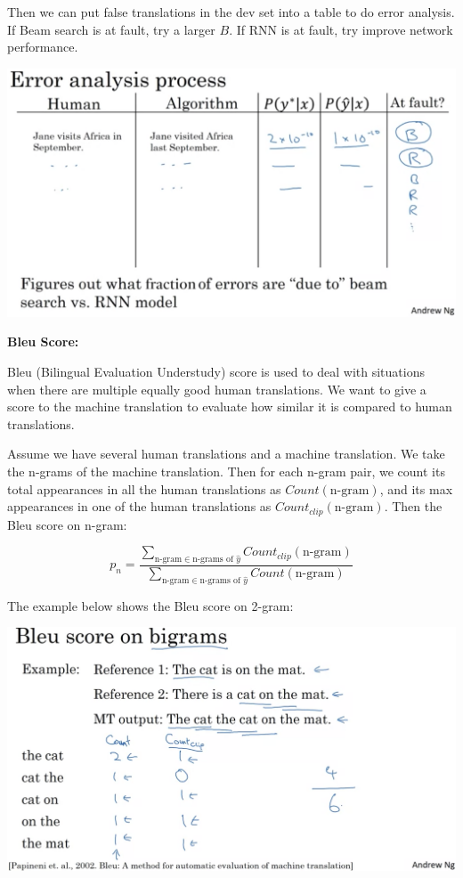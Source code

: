 \documentclass{article}
\begin{document}
\noindent Then we can put false translations in the dev set into a table to do error analysis. If Beam search is at fault, try a larger \(B\). If RNN is at fault, try improve network performance.

\begin{center}
\includegraphics[scale=0.3]{./images/beam_error.png}
\end{center}

\noindent \textbf{Bleu Score:}

\noindent Bleu (Bilingual Evaluation Understudy) score is used to deal with situations when there are multiple equally good human translations. We want to give a score to the machine translation to evaluate how similar it is compared to human translations.

\bigskip

\noindent Assume we have several human translations and a machine translation. We take the n-grams of the machine translation. Then for each n-gram pair, we count its total appearances in all the human translations as \(Count(\text{n-gram})\), and its max appearances in one of the human translations as \(Count_{clip}(\text{n-gram})\). Then the Bleu score on n-gram:

\[p_{n} = \frac{\sum_{\text{n-gram} \in \text{n-grams of } \hat{y}} Count_{clip}(\text{n-gram})}{\sum_{\text{n-gram} \in \text{n-grams of } \hat{y}} Count(\text{n-gram})}\]

\noindent The example below shows the Bleu score on 2-gram:

\begin{center}
\includegraphics[scale=0.3]{./images/bleu_score_2gram.png}
\end{center}
\end{document}
